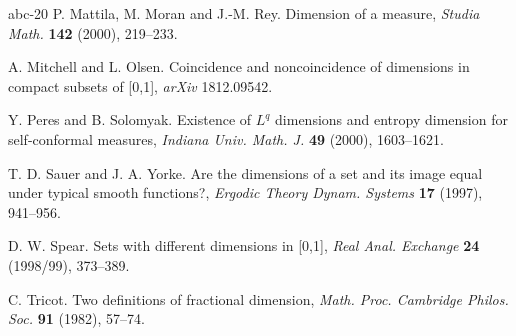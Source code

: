 \documentclass[12pt]{article}
\newcommand{\1}{{\bf 1}}
\begin{document}
\begin{thebibliography}{abc-20}
P. Mattila, M. Moran and  J.-M. Rey. Dimension of a measure,  
{\it Studia Math.} {\bf 142} (2000), 219--233.

A. Mitchell and L. Olsen. Coincidence and noncoincidence of dimensions in compact subsets of [0,1],
{\it arXiv} 1812.09542.

Y. Peres and B. Solomyak. Existence of $L^q$ dimensions and entropy dimension for self-conformal measures, {\it Indiana Univ. Math. J.} {\bf 49} (2000), 1603–1621.

T. D. Sauer and J. A. Yorke. Are the dimensions of a set and its image equal under typical smooth functions?,  {\it Ergodic Theory Dynam. Systems} {\bf 17} (1997), 941--956.

D. W. Spear. Sets with different dimensions in [0,1], {\it Real Anal. Exchange} {\bf 24} (1998/99), 373--389.

C. Tricot. Two definitions of fractional dimension,  {\it Math. Proc. Cambridge Philos. Soc.} {\bf 91} (1982), 57--74.



\end{thebibliography}


\bigskip
\end{document}

